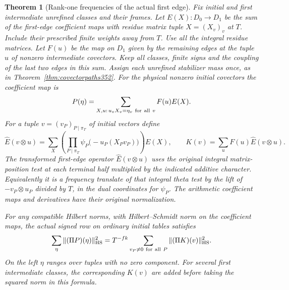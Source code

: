 \documentclass[a4paper,11pt]{article}
\newtheorem{theorem}[proposition]{Theorem}
\theoremstyle{definition}
\theoremstyle{remark}
\numberwithin{equation}{section}
\begin{document}
\begin{theorem}[Rank-one frequencies of the actual first edge]
\label{thm:firstslice395}
Fix initial and first intermediate unrefined classes and their
frames. Let \(E(X):D_0\to D_1\) be the sum of the first-edge
coefficient maps with residue matrix tuple \(X=(X_v)_v\)
at \(T\). Include their prescribed finite weights away from
\(T\). Use all the integral residue matrices. Let \(F(u)\)
be the map on \(D_1\) given by the remaining edges at the
tuple \(u\) of nonzero intermediate covectors. Keep all
classes, finite signs and the coupling of the last two
edges in this sum. Assign each unrefined stabilizer mass
once, as in Theorem~\ref{thm:covectorpaths352}. For the
physical nonzero initial covectors the coefficient map is
\[
           P(\eta)=\sum_{X,u:\,u_vX_v=\eta_v\ {\rm for\ all}\ v}
                         F(u)E(X).
\]
For a tuple \(v=(v_P)_{P\mid\pi_T}\) of initial vectors define
\[
 \widehat E(v\otimes u)
   =\sum_X \left(\prod_{P\mid\pi_T}
             \psi_P\big(-u_P(X_Pv_P)\big)\right)E(X),\qquad
 K(v)=\sum_u F(u)\widehat E(v\otimes u).
\]
The transformed first-edge operator \(\widehat E(v\otimes u)\)
uses the original integral matrix-position test at each
terminal half multiplied by the indicated additive character.
Equivalently it is a frequency translate of that integral
theta test by the lift of \(-v_P\otimes u_P\) divided by \(T\),
in the dual coordinates for \(\psi_P\). The arithmetic
coefficient maps and derivatives have their original normalization.

For any compatible Hilbert norms, with Hilbert--Schmidt norm on
the coefficient maps, the actual signed row on ordinary initial
tables satisfies
\[
    \sum_{\eta}\|(\Pi P)(\eta)\|_{\rm HS}^2
         =T^{-fk}\sum_{v_P\ne0\ {\rm for\ all}\ P}
                                   \|(\Pi K)(v)\|_{\rm HS}^2 .
\]
On the left \(\eta\) ranges over tuples with no zero component.
For several first intermediate classes, the corresponding \(K(v)\)
are added before taking the squared norm in this formula.
\end{theorem}
\end{document}
